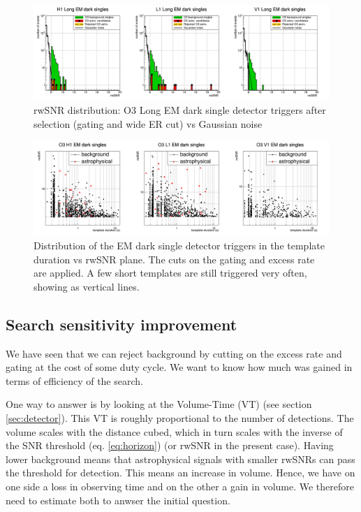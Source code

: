 % 
%
\begin{figure}
  \centering
  \includegraphics[width=\textwidth]{sectionSelection/plotsEMdark/cPosterAllCut.png}
  \caption{rwSNR distribution: O3 Long EM dark single detector triggers after selection (gating and wide ER cut) vs Gaussian noise}
  \label{fig:compare_longDark_gaus_selec}
\end{figure}
% 
%


\begin{figure}
  \centering
  \includegraphics[width=\linewidth]{sectionSelection/plotsEMdark/cSnrTempDurAllCut.png}
  \caption{Distribution of the EM dark single detector triggers in the template duration vs rwSNR plane. The cuts on the gating and excess rate are applied. A few short templates are still triggered very often, showing as vertical lines.}
  \label{fig:emdark_snrTempDur_allcut}
\end{figure}



\clearpage\newpage
\subsection{Search sensitivity improvement}
\label{sec:reweightER}

We have seen that we can reject background by cutting on the excess rate and gating at the cost of some duty cycle.
We want to know how much was gained in terms of efficiency of the search.

One way to answer is by looking at the Volume-Time (VT) (see section \ref{sec:detector}).
This VT is roughly proportional to the number of detections.
The volume scales with the distance cubed, which in turn scales with the inverse of the SNR threshold (eq. \ref{eq:horizon}) (or rwSNR in the present case).
Having lower background means that astrophysical signals with smaller rwSNRs can pass the threshold for detection.
This means an increase in volume.
Hence, we have on one side a loss in observing time and on the other a gain in volume.
We therefore need to estimate both to anwser the initial question.

